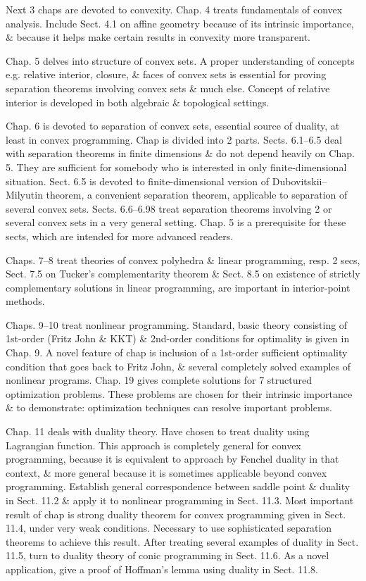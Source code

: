 \documentclass{article}
\begin{document}
\begin{itemize}
    Next 3 chaps are devoted to convexity. Chap. 4 treats fundamentals of convex analysis. Include Sect. 4.1 on affine geometry because of its intrinsic importance, \& because it helps make certain results in convexity more transparent.
    
    Chap. 5 delves into structure of convex sets. A proper understanding of concepts e.g. relative interior, closure, \& faces of convex sets is essential for proving separation theorems involving convex sets \& much else. Concept of relative interior is developed in both algebraic \& topological settings.
    
    Chap. 6 is devoted to separation of convex sets, essential source of duality, at least in convex programming. Chap is divided into 2 parts. Sects. 6.1--6.5 deal with separation theorems in finite dimensions \& do not depend heavily on Chap. 5. They are sufficient for somebody who is interested in only finite-dimensional situation. Sect. 6.5 is devoted to finite-dimensional version of Dubovitskii--Milyutin theorem, a convenient separation theorem, applicable to separation of several convex sets. Sects. 6.6--6.98 treat separation theorems involving 2 or several convex sets in a very general setting. Chap. 5 is a prerequisite for these sects, which are intended for more advanced readers.
    
    Chaps. 7--8 treat theories of convex polyhedra \& linear programming, resp. 2 secs, Sect. 7.5 on Tucker's complementarity theorem \& Sect. 8.5 on existence of strictly complementary solutions in linear programming, are important in interior-point methods.
    
    Chaps. 9--10 treat nonlinear programming. Standard, basic theory consisting of 1st-order (Fritz John \& KKT) \& 2nd-order conditions for optimality is given in Chap. 9. A novel feature of chap is inclusion of a 1st-order sufficient optimality condition that goes back to {\sc Fritz John}, \& several completely solved examples of nonlinear programs. Chap. 19 gives complete solutions for 7 structured optimization problems. These problems are chosen for their intrinsic importance \& to demonstrate: optimization techniques can resolve important problems.
    
    Chap. 11 deals with duality theory. Have chosen to treat duality using Lagrangian function. This approach is completely general for convex programming, because it is equivalent to approach by Fenchel duality in that context, \& more general because it is sometimes applicable beyond convex programming. Establish general correspondence between saddle point \& duality in Sect. 11.2 \& apply it to nonlinear programming in Sect. 11.3. Most important result of chap is strong duality theorem for convex programming given in Sect. 11.4, under very weak conditions. Necessary to use sophisticated separation theorems to achieve this result. After treating several examples of duality in Sect. 11.5, turn to duality theory of conic programming in Sect. 11.6. As a novel application, give a proof of Hoffman's lemma using duality in Sect. 11.8. 
    

\end{itemize}
\end{document}
